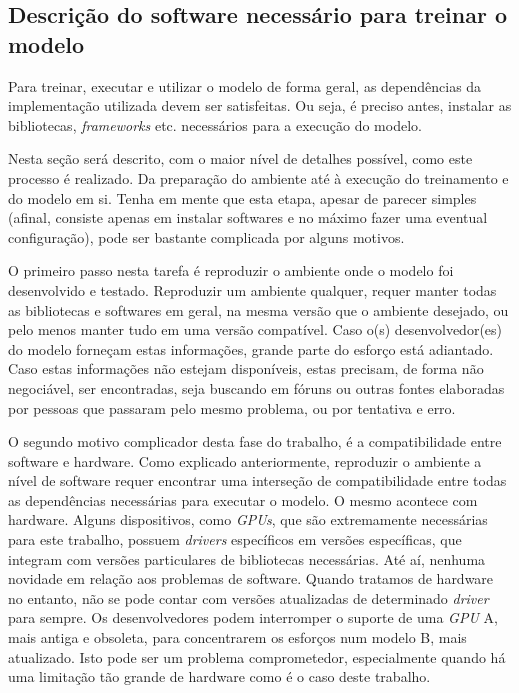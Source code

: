 \subsection{Descrição do software necessário para treinar o modelo}

Para treinar, executar e utilizar o modelo de forma geral, as dependências da implementação utilizada devem ser satisfeitas. Ou seja, é preciso antes, instalar as bibliotecas, \textit{frameworks} etc. necessários para a execução do modelo.

Nesta seção será descrito, com o maior nível de detalhes possível, como este processo é realizado. Da preparação do ambiente até à execução do treinamento e do modelo em si. Tenha em mente que esta etapa, apesar de parecer simples (afinal, consiste apenas em instalar softwares e no máximo fazer uma eventual configuração), pode ser bastante complicada por alguns motivos.

O primeiro passo nesta tarefa é reproduzir o ambiente onde o modelo foi desenvolvido e testado. Reproduzir um ambiente qualquer, requer manter todas as bibliotecas e softwares em geral, na mesma versão que o ambiente desejado, ou pelo menos manter tudo em uma versão compatível. Caso o(s) desenvolvedor(es) do modelo forneçam estas informações, grande parte do esforço está adiantado. Caso estas informações não estejam disponíveis, estas precisam, de forma não negociável, ser encontradas, seja buscando em fóruns ou outras fontes elaboradas por pessoas que passaram pelo mesmo problema, ou por tentativa e erro.

O segundo motivo complicador desta fase do trabalho, é a compatibilidade entre software e hardware. Como explicado anteriormente, reproduzir o ambiente a nível de software requer encontrar uma interseção de compatibilidade entre todas as dependências necessárias para executar o modelo. O mesmo acontece com hardware. Alguns dispositivos, como \textit{GPUs}, que são extremamente necessárias para este trabalho, possuem \textit{drivers} específicos em versões específicas, que integram com versões particulares de bibliotecas necessárias. Até aí, nenhuma novidade em relação aos problemas de software. Quando tratamos de hardware no entanto, não se pode contar com versões atualizadas de determinado \textit{driver} para sempre. Os desenvolvedores podem interromper o suporte de uma \textit{GPU} A, mais antiga e obsoleta, para concentrarem os esforços num modelo B, mais atualizado. Isto pode ser um problema comprometedor, especialmente quando há uma limitação tão grande de hardware como é o caso deste trabalho.

